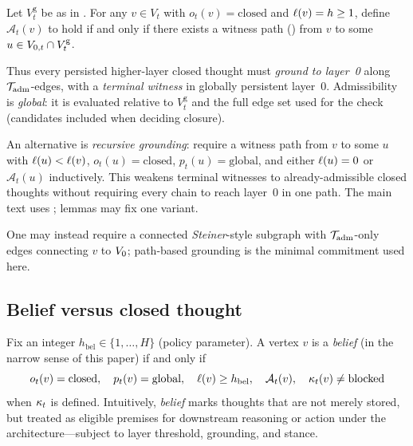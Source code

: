\begin{definition}
\label{def:admissibility}
Let $V^{\mathrm{g}}_t$ be as in .
For any $v\in V_t$ with $o_t(v)=\text{closed}$ and $\ell(v)=h\ge 1$, define $\mathcal{A}_t(v)$ to hold if and only if there exists a witness path () from $v$ to some $u\in V_{0,t}\cap V^{\mathrm{g}}_t$.
\end{definition}

Thus every persisted higher-layer closed thought must \emph{ground to layer~0} along $\mathcal{T}_{\mathrm{adm}}$-edges, with a \emph{terminal witness} in globally persistent layer~0.
Admissibility is \emph{global}: it is evaluated relative to $V^{\mathrm{g}}_t$ and the full edge set used for the check (candidates included when deciding closure).

\begin{remark}
\label{rem:adm-variant}
An alternative is \emph{recursive grounding}: require a witness path from $v$ to some $u$ with $\ell(u)<\ell(v)$, $o_t(u)=\text{closed}$, $p_t(u)=\text{global}$, and either $\ell(u)=0$ or $\mathcal{A}_t(u)$ inductively.
This weakens terminal witnesses to already-admissible closed thoughts without requiring every chain to reach layer~0 in one path.
The main text uses ; lemmas may fix one variant.
\end{remark}

\begin{remark}
\label{rem:adm-subgraph}
One may instead require a connected \emph{Steiner}-style subgraph with $\mathcal{T}_{\mathrm{adm}}$-only edges connecting $v$ to $V_{0}$; path-based grounding is the minimal commitment used here.
\end{remark}

\subsection{Belief versus closed thought}
\label{sec:belief}

\begin{definition}
\label{def:belief}
Fix an integer $h_{\mathrm{bel}}\in\{1,\ldots,H\}$ (policy parameter).
A vertex $v$ is a \emph{belief} (in the narrow sense of this paper) if and only if
\[
  o_t(v)=\text{closed},\quad p_t(v)=\text{global},\quad \ell(v)\ge h_{\mathrm{bel}},\quad \mathcal{A}_t(v),\quad \kappa_t(v)\neq \mathrm{blocked}
\]
when $\kappa_t$ is defined.
Intuitively, \emph{belief} marks thoughts that are not merely stored, but treated as eligible premises for downstream reasoning or action under the architecture---subject to layer threshold, grounding, and stance.
\end{definition}

